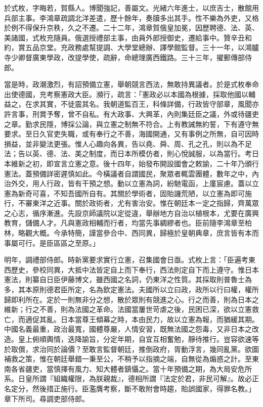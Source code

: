 \begin{pinyinscope}
於式枚，字晦若，賀縣人。博聞強記，善屬文。光緒六年進士，以庶吉士，散館用兵部主事。李鴻章疏調北洋差遣，歷十餘年，奏牘多出其手。性不樂為外吏，又格於例不得保升京秩，久之不遷。二十二年，鴻章賀俄皇加冕，因歷聘德、法、英、美諸國，式枚充隨員。俄選授禮部主事，由員外郎授御史，遷給事中。贊辛丑和約，賞五品京堂。充政務處幫提調、大學堂總辦、譯學館監督。三十一年，以鴻臚寺少卿督廣東學政，改提學使，疏辭，命總理廣西鐵路。三十三年，擢郵傳部侍郎。

當是時，政潮激烈，有詔預備立憲，舉朝競言西法，無敢持異議者。於是式枚奉命出使德國，充考察憲政大臣。瀕行，疏言：「憲政必以本國為根據，採取他國以輔益之，在求其實，不徒震其名。我朝道監百王，科條詳備，行政皆守部章，風聞亦許言事，刑賞予奪，曾不自私。有大政事、大興革，內則集廷臣之議，外或待疆吏之章。勤求民隱，博採公論，與立憲之制無不符合。上有教誡無約誓，下有遵守無要求。至日久官吏失職，或有奉行之不善，海國開通，又有事例之所無，自可因時損益，並非變法更張。惟人心趣向各異，告以堯、舜、周、孔之孔，則以為不足法；告以英、德、法、美之制度，而日本所模仿者，則心悅誠服，以為當行。考日本維新之初，即宣言立憲之意。後十四年，始發布開設國會之敕諭，二十年乃頒行憲法。蓋預備詳密遲慎如此。今橫議者自謂國民，聚眾者輒雲團體，數年之中，內治外交，用人行政，皆有干預之想。動以立憲為詞，紛馳電函，上廑宸慮。蓋以立憲為新奇可喜，不知吾國所自有。其關於學術者，固貽譏荒陋，以立憲為即可施行，不審東洋之近事。關於政術者，尤有害治安。惟在朝廷本一定之指歸，齊萬眾之心志，循序漸進。先設京師議院以定從違，舉辦地方自治以植根本，尤要在廣興教育，儲備人才。凡與憲政相輔而行者，均當先事綢繆者也。臣前隨李鴻章至柏林，略觀大概。今承特簡，謹當參合中、西同異，歸極於皇朝典章，庶言皆有本而事屬可行。是臣區區之至原。」

明年，調禮部侍郎。時新黨要求實行立憲，召集國會日亟。式枚上言：「臣遍考東西歷史，參校同異，大抵中法皆定自上而下奉行，西法則定自下而上遵守。惟日本憲法，則纂自日臣伊藤博文，雖西國之名詞，仍東洋之性質。其採取則普魯士為多，其本原則德君臣所定，名為欽定憲法。夫國所以立曰政，政所以行曰權，權所歸即利所在。定於一則無非分之想，散於眾則有競進之心。行之而善，則為日本之維新；行之不善，則為法國之革命。法國當屢世苛虐之後，民困已深，欲以立憲救亡，而適促其亂。日本當尊王傾幕之時，本由民力，故以立憲為報，而猶緩其期。中國名義最重，政治最寬，國體尊嚴，人情安習，既無法國之怨毒，又非日本之改造。皇上俯順輿情，迭降諭旨，分定年期，自宜互相奮勉，靜待推行。豈容欲速等於取償，求治同於論價？至敢言監督朝廷，推倒政府，胥動浮言，幾同亂黨。欲圖補救之策，惟在朝廷舉錯一秉至公，不稍予以指摘之端，自無從為煽惑之計。至東南各省疆吏，當慎擇有風力、知大體者鎮懾之。當十年預備之期，為大局安危所系。日皇所謂『組織權限，為朕親裁』，德相所謂『法定於君，非民可解』。故必正名定分，然後措正施行。臣濫膺考察，斷不敢附會時趨，貽誤國家，得罪名教。」章下所司。尋調吏部侍郎。


\end{pinyinscope}
